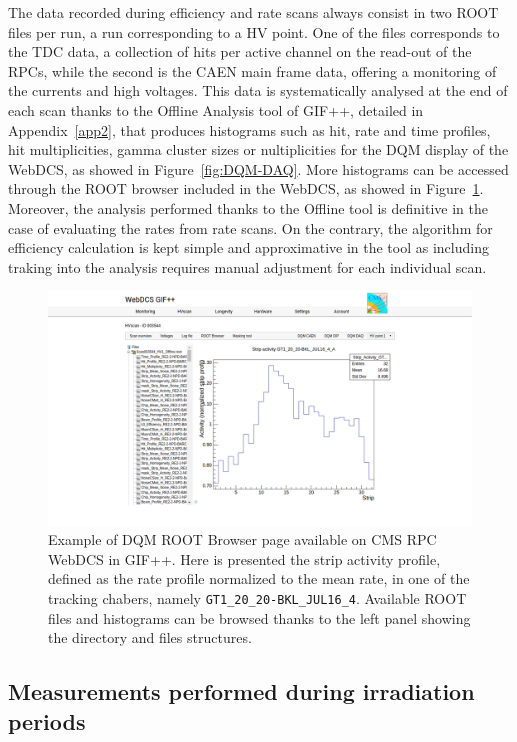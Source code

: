 	The data recorded during efficiency and rate scans always consist in two ROOT files per run, a run corresponding to a HV point. One of the files corresponds to the TDC data, a collection of hits per active channel on the read-out of the RPCs, while the second is the CAEN main frame data, offering a monitoring of the currents and high voltages. This data is systematically analysed at the end of each scan thanks to the Offline Analysis tool of GIF++, detailed in Appendix~\ref{app2}, that produces histograms such as hit, rate and time profiles, hit multiplicities, gamma cluster sizes or nultiplicities for the DQM display of the WebDCS, as showed in Figure~\ref{fig:DQM-DAQ}. More histograms can be accessed through the ROOT browser included in the WebDCS, as showed in Figure~\ref{fig:DQM-ROOT}. Moreover, the analysis performed thanks to the Offline tool is definitive in the case of evaluating the rates from rate scans. On the contrary, the algorithm for efficiency calculation is kept simple and approximative in the tool as including traking into the analysis requires manual adjustment for each individual scan.

	\begin{figure}[H]
        \centering
		\includegraphics[width = \linewidth]{fig/chapt5/GIFpp-ROOT-browser.png}
		\caption{\label{fig:DQM-ROOT} Example of DQM ROOT Browser page available on CMS RPC WebDCS in GIF++. Here is presented the strip activity profile, defined as the rate profile normalized to the mean rate, in one of the tracking chabers, namely \texttt{GT1\_20\_20-BKL\_JUL16\_4}. Available ROOT files and histograms can be browsed thanks to the left panel showing the directory and files structures.}
	\end{figure}

	\subsection{Measurements performed during irradiation periods}
	\label{chapt5:ssec:irradiation}

